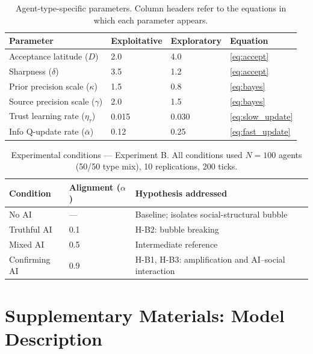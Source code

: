 \documentclass[pdflatex,sn-apa]{sn-jnl}%
\begin{document}
\begin{table}[h]
\centering
\caption{Agent-type-specific parameters.
Column headers refer to the equations in which each parameter appears.}
\label{tab:agent_params}
\renewcommand{\arraystretch}{1.25}
\begin{tabular}{llll}
\hline
\textbf{Parameter} & \textbf{Exploitative} & \textbf{Exploratory} & \textbf{Equation} \\
\hline
Acceptance latitude ($D$)         & 2.0   & 4.0   & \ref{eq:accept} \\
Sharpness ($\delta$)              & 3.5   & 1.2   & \ref{eq:accept} \\
Prior precision scale ($\kappa$)  & 1.5   & 0.8   & \ref{eq:bayes}  \\
Source precision scale ($\gamma$) & 2.0   & 1.5   & \ref{eq:bayes}  \\
Trust learning rate ($\eta_\tau$) & 0.015 & 0.030 & \ref{eq:slow_update} \\
Info Q-update rate ($\bar\alpha$) & 0.12  & 0.25  & \ref{eq:fast_update} \\
\hline
\end{tabular}
\end{table}

\begin{table}[h]
\centering
\caption{Experimental conditions — Experiment B. All conditions used
$N=100$ agents (50/50 type mix), 10 replications, 200 ticks.}
\label{tab:expB}
\renewcommand{\arraystretch}{1.25}
\begin{tabular}{lll}
\hline
\textbf{Condition} & \textbf{Alignment ($\alpha$)} & \textbf{Hypothesis addressed} \\
\hline
No AI         & ---  & Baseline; isolates social-structural bubble \\
Truthful AI   & 0.1  & H-B2: bubble breaking \\
Mixed AI      & 0.5  & Intermediate reference \\
Confirming AI & 0.9  & H-B1, H-B3: amplification and AI--social interaction \\
\hline
\end{tabular}
\end{table}




\section{Supplementary Materials: Model Description}
\end{document}
